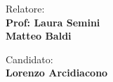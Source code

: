 \begin{titlepage}
\begin{minipage}[t]{0.47\textwidth}
	{\large{Relatore:}{\normalsize\vspace{3mm}
	\bf\\ \large{Prof: Laura Semini} \normalsize\vspace{3mm}\bf \\ \large{Matteo Baldi}}}
\end{minipage}
\hfill
\begin{minipage}[t]{0.47\textwidth}\raggedleft
	{\large{Candidato:}{\normalsize\vspace{3mm} \bf\\ \large{Lorenzo Arcidiacono}}}
\end{minipage}

\vspace{30mm}
\hrulefill
\\

\end{titlepage}